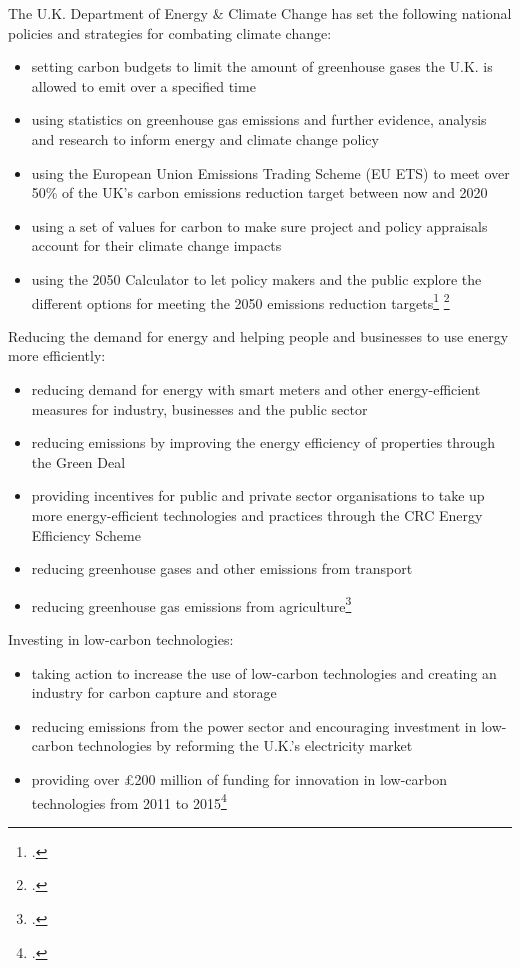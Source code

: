 The U.K. Department of Energy \& Climate Change has set the following national policies and strategies for combating climate change:
\begin{itemize}
	\item setting carbon budgets to limit the amount of greenhouse gases the U.K. is allowed to emit over a specified time
	\item using statistics on greenhouse gas emissions and further evidence, analysis and research to inform energy and climate change policy
	\item using the European Union Emissions Trading Scheme (EU ETS) to meet over 50\% of the UK's carbon emissions reduction target between now and 2020
	\item using a set of values for carbon to make sure project and policy appraisals account for their climate change impacts
	\item using the 2050 Calculator to let policy makers and the public explore the different options for meeting the 2050 emissions reduction targets\footcite[][]{UKgovnt} \footcite[][]{EUETS}
\end{itemize}



Reducing the demand for energy and helping people and businesses to use energy more efficiently:
\begin{itemize}
	\item reducing demand for energy with smart meters and other energy-efficient measures for industry, businesses and the public sector
	\item reducing emissions by improving the energy efficiency of properties through the Green Deal
	\item providing incentives for public and private sector organisations to take up more energy-efficient technologies and practices through the CRC Energy Efficiency Scheme 
	\item reducing greenhouse gases and other emissions from transport
	\item reducing greenhouse gas emissions from agriculture\footcite[][]{UKgovnt}
\end{itemize}



Investing in low-carbon technologies:
\begin{itemize}
	\item taking action to increase the use of low-carbon technologies and creating an industry for carbon capture and storage
	\item reducing emissions from the power sector and encouraging investment in low-carbon technologies by reforming the U.K.'s electricity market
	\item providing over £200 million of funding for innovation in low-carbon technologies from 2011 to 2015\footcite[][]{UKgovnt}
\end{itemize}



